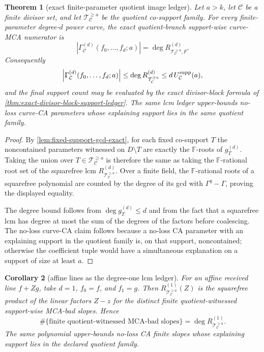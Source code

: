 \documentclass[11pt]{article}
\newtheorem{theorem}{Theorem}[section]
\newtheorem{corollary}[theorem]{Corollary}
\theoremstyle{definition}
\theoremstyle{remark}
\newcommand{\F}{\mathbb{F}}
\begin{document}
\begin{theorem}[exact finite-parameter quotient image ledger]
\label{thm:exact-quotient-image-lcm-ledger}
Let $a>k$, let $\mathcal C$ be a finite divisor set, and let
$\mathcal T_{\mathcal C}^{\ge a}$ be the quotient co-support family.  For every
finite-parameter degree-$d$ power curve, the exact quotient-branch support-wise
curve-MCA numerator is
\[
        \boxed{
        \left|\Gamma_{\mathcal C}^{(d)}(f_0,\ldots,f_d;a)\right|
        =\deg R_{\mathcal T_{\mathcal C}^{\ge a},F}^{(d)} .
        }
\]
Consequently
\[
        \left|\Gamma_{\mathcal C}^{(d)}(f_0,\ldots,f_d;a)\right|
        \le \deg R_{\mathcal T_{\mathcal C}^{\ge a}}^{(d)}
        \le d\,U_{\mathcal C}^{\rm supp}(a),
\]
and the final support count may be evaluated by the exact divisor-block formula
of \cref{thm:exact-divisor-block-support-ledger}.  The same lcm ledger
upper-bounds no-loss curve-CA parameters whose explaining support lies in the
same quotient family.
\end{theorem}

\begin{proof}
By \cref{lem:fixed-support-gcd-exact}, for each fixed co-support $T$ the
noncontained parameters witnessed on $D\setminus T$ are exactly the $\F$-roots of
$g_T^{(d)}$.  Taking the union over
$T\in\mathcal T_{\mathcal C}^{\ge a}$ is therefore the same as taking the
$\F$-rational root set of the squarefree lcm
$R_{\mathcal T_{\mathcal C}^{\ge a}}^{(d)}$.  Over a finite field, the
$\F$-rational roots of a squarefree polynomial are counted by the degree of its
gcd with $\Gamma^q-\Gamma$, proving the displayed equality.

The degree bound follows from $\deg g_T^{(d)}\le d$ and from the fact that a
squarefree lcm has degree at most the sum of the degrees of the factors before
coalescing.  The no-loss curve-CA claim follows because a no-loss CA parameter
with an explaining support in the quotient family is, on that support,
noncontained; otherwise the coefficient tuple would have a simultaneous
explanation on a support of size at least $a$.
\end{proof}

\begin{corollary}[affine lines as the degree-one lcm ledger]
\label{cor:affine-line-lcm-ledger}
For an affine received line $f+Zg$, take $d=1$, $f_0=f$, and $f_1=g$.  Then
$R_{\mathcal T_{\mathcal C}^{\ge a}}^{(1)}(Z)$ is the squarefree product of the
linear factors $Z-z$ for the distinct finite quotient-witnessed support-wise
MCA-bad slopes.  Hence
\[
        \#\{\text{finite quotient-witnessed MCA-bad slopes}\}
        =\deg R_{\mathcal T_{\mathcal C}^{\ge a}}^{(1)} .
\]
The same polynomial upper-bounds no-loss CA finite slopes whose explaining
support lies in the declared quotient family.
\end{corollary}
\end{document}
